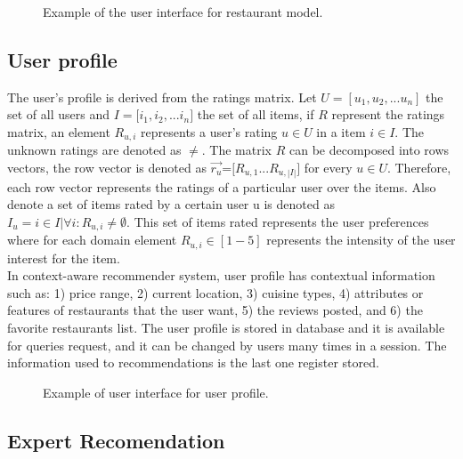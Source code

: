 \begin{figure*}
\captionsetup{justification=centering,margin=2cm}
\centering
\setlength\fboxsep{0pt}
\setlength\fboxrule{0.7pt}
\caption{Example of the user interface for restaurant model.}
\label{fig:restaurantmodel}   
\end{figure*}
\subsection{User profile} \label{sec:3.2}  

The user's profile is derived from the ratings matrix. Let $U=[u_1,u_2,...u_n]$
the set of all users and $ I=[i_1,i_2,$...$i_n] $ the set of all items, if $R$
represent the ratings matrix,  an element  $R_{u,i}$ represents a user’s rating
$u \in U$  in a item $i \in I$.  The unknown ratings are denoted as $\neq $. The
matrix $R$ can be decomposed into rows vectors, the row vector is denoted as $
\overrightarrow{r_u} $=$[R_{u,1}$...$R_{u,|I|}]$ for every $u \in U$. Therefore,
each row vector represents the ratings of a particular user over the items. Also
denote a set of items rated by a certain user u is denoted as $ I_u = i \in I |
\forall  i: R_{u,i} \neq \emptyset $. This set of items rated represents the
user preferences where for each domain element $R_{u,i} \in [1-5]$ represents
the intensity of the user interest for  the item.\\  In context-aware
recommender system, user profile has contextual information such as: 1) price
range, 2) current location, 3) cuisine types, 4) attributes or features of
restaurants that the user want, 5) the reviews posted, and 6) the favorite
restaurants list. The user profile is stored in database and it is available for
queries request, and it can be changed by users many times in a session. The
information used to recommendations is the last one register stored.

\begin{figure*}
\captionsetup{justification=centering,margin=2cm}
\centering
\setlength\fboxsep{0pt}
\setlength\fboxrule{0.7pt}
\caption{Example of user interface for user profile.}
\label{fig:user-profile}       
\end{figure*}

\subsection{Expert Recomendation} \label{sec:3.3} 

